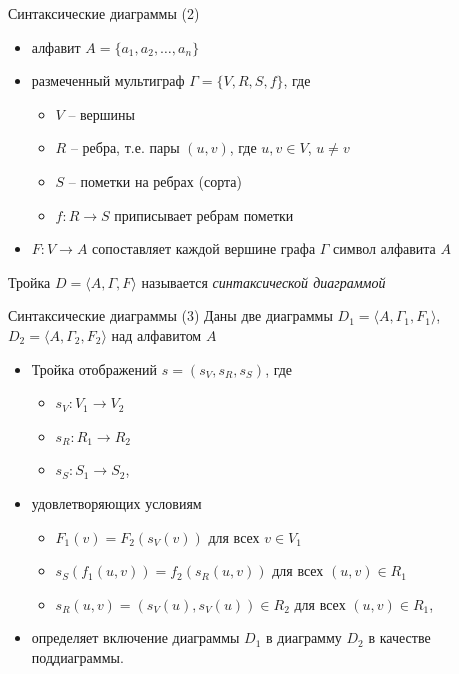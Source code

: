 \documentclass{beamer}
\begin{document}
\begin{frame}{Синтаксические диаграммы (2)}
\begin{small}
\begin{itemize}
	\item алфавит $A = \{ a_1, a_2, \dots, a_n \}$
	\item размеченный мультиграф $\Gamma = \{ V, R, S, f \}$, где 
		\begin{itemize}
			\item $V$ -- вершины
			\item $R$ -- ребра, т.е. пары $(u, v)$, где $u, v \in V$, $u \neq v$
			\item $S$ -- пометки на ребрах (сорта)
			\item $f : R \to S$ приписывает ребрам пометки
		\end{itemize}
	\item $F : V \to A$ сопоставляет каждой вершине графа $\Gamma$ символ алфавита $A$
\end{itemize}
\end{small}
\medskip
Тройка $D = \langle A, \Gamma, F \rangle$ называется \textit{синтаксической диаграммой}
\end{frame}

\begin{frame}{Синтаксические диаграммы (3)}
Даны две диаграммы $D_1 = \langle A, \Gamma_1, F_1 \rangle$, $D_2 = \langle A, \Gamma_2, F_2 \rangle$ над алфавитом $A$\\
\medskip
\begin{itemize}
	\item[] Тройка отображений $s = (s_V, s_R, s_S)$, где 
		\begin{itemize}
			\item $s_V : V_1 \to V_2$
			\item $s_R : R_1 \to R_2$
			\item $s_S : S_1 \to S_2$,
		\end{itemize}
	\item[] удовлетворяющих условиям
		\begin{itemize}
			\item $F_1(v) = F_2(s_V(v))$ для всех $v \in V_1$
			\item $s_S(f_1(u, v)) = f_2(s_R(u, v))$ для всех $(u, v) \in R_1$
			\item $s_R(u, v) = (s_V(u), s_V(u)) \in R_2$ для всех $(u, v) \in R_1$,
		\end{itemize}
	\item[] определяет включение диаграммы $D_1$ в диаграмму $D_2$ в качестве поддиаграммы.
\end{itemize}
\end{frame}
\end{document}
